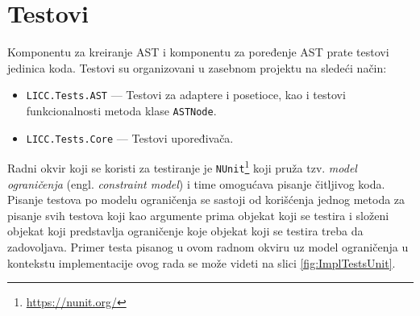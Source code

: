 \section{Testovi}
\label{sec:ImplementationTests}

Komponentu za kreiranje AST i komponentu za poređenje AST prate testovi jedinica koda. Testovi su organizovani u zasebnom projektu na sledeći način:
\begin{itemize}
    \item \texttt{LICC.Tests.AST} --- Testovi za adaptere i posetioce, kao i testovi funkcionalnosti metoda klase \texttt{ASTNode}.
    \item \texttt{LICC.Tests.Core} --- Testovi upoređivača.
\end{itemize}

Radni okvir koji se koristi za testiranje je \texttt{NUnit}\footnote{\url{https://nunit.org/}} koji pruža tzv. \emph{model ograničenja} (engl. \emph{constraint model}) i time omogućava pisanje čitljivog koda. Pisanje testova po modelu ograničenja se sastoji od korišćenja jednog metoda za pisanje svih testova koji kao argumente prima objekat koji se testira i složeni objekat koji predstavlja ograničenje koje objekat koji se testira treba da zadovoljava. Primer testa pisanog u ovom radnom okviru uz model ograničenja u kontekstu implementacije ovog rada se može videti na slici \ref{fig:ImplTestsUnit}.

